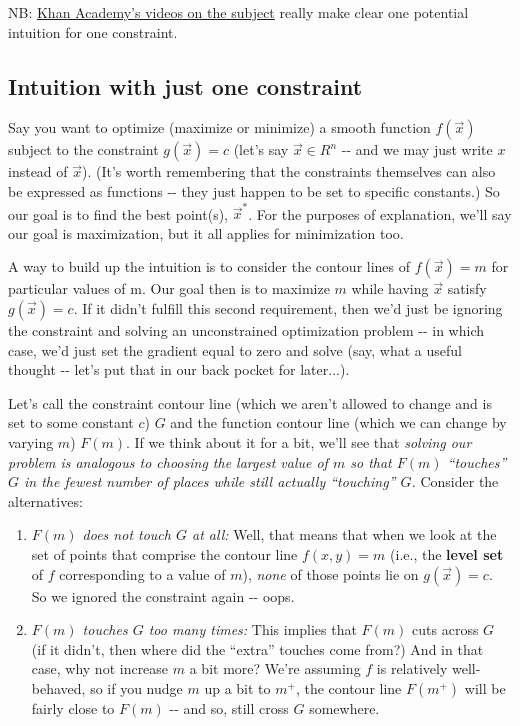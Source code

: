 \documentclass[letterpaper,12pt]{report}
\providecommand{\tightlist}{%
  \setlength{\itemsep}{0pt}\setlength{\parskip}{0pt}}
\begin{document}
NB:
\href{https://www.khanacademy.org/math/multivariable-calculus/applications-of-multivariable-derivatives/lagrange-multipliers-and-constrained-optimization/v/constrained-optimization-introduction}
{Khan
Academy's videos on the subject} really make clear one potential
intuition for one constraint.

\subsection{Intuition with just one
constraint}\label{intuition-with-just-one-constraint}

Say you want to optimize (maximize or minimize) a smooth function
\(f(\vec{x})\) subject to the constraint \(g(\vec{x}) = c\) (let's say
\(\vec{x} \in R^n\) -\/- and we may just write \(x\) instead of
\(\vec{x}\)). (It's worth remembering that the constraints themselves
can also be expressed as functions -\/- they just happen to be set to
specific constants.) So our goal is to find the best point(s),
\({\vec{x}^*}\). For the purposes of explanation, we'll say our goal is
maximization, but it all applies for minimization too.

A way to build up the intuition is to consider the contour lines of
\(f(\vec{x}) = m\) for particular values of m. Our goal then is to
maximize \(m\) while having \(\vec{x}\) satisfy \(g(\vec{x}) = c\). If
it didn't fulfill this second requirement, then we'd just be ignoring
the constraint and solving an unconstrained optimization problem -\/- in
which case, we'd just set the gradient equal to zero and solve (say,
what a useful thought -\/- let's put that in our back pocket for
later...).

Let's call the constraint contour line (which we aren't allowed to
change and is set to some constant \(c\)) \(G\) and the function contour
line (which we can change by varying \(m\)) \(F(m)\). If we think about
it for a bit, we'll see that \emph{solving our problem is analogous to
choosing the largest value of \(m\) so that \(F(m)\) ``touches'' \(G\) in
the fewest number of places while still actually ``touching'' \(G\).}
Consider the alternatives:

\begin{enumerate}
\tightlist
\item
  \emph{\(F(m)\) does not touch \(G\) at all:} Well, that means that
  when we look at the set of points that comprise the contour line
  \(f(x,y) = m\) (i.e., the \textbf{level set} 
   of \(f\) corresponding to
  a value of \(m\)), \emph{none} of those points lie on
  \(g(\vec{x}) = c\). So we ignored the constraint again -\/- oops.
\item
  \emph{\(F(m)\) touches \(G\) too many times:} This implies that
  \(F(m)\) cuts across \(G\) (if it didn't, then where did the ``extra''
  touches come from?) And in that case, why not increase \(m\) a bit
  more? We're assuming \(f\) is relatively well-behaved, so if you nudge
  \(m\) up a bit to \(m^+\), the contour line \(F(m^+)\) will be fairly
  close to \(F(m)\) -\/- and so, still cross \(G\) somewhere.
\end{enumerate}
\end{document}
